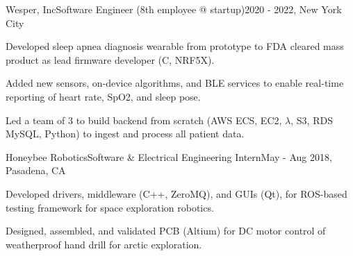 \documentclass[letterpaper,10pt]{article}
\begin{document}
\begin{joblong}{Wesper, Inc}{Software Engineer (8th employee @ startup)}{2020 - 2022, New York City}
\item Developed sleep apnea diagnosis wearable from prototype to FDA cleared mass product as lead firmware developer (C, NRF5X).
\item Added new sensors, on-device algorithms, and BLE services to enable real-time reporting of heart rate, SpO2, and sleep pose.
\item Led a team of 3 to build backend from scratch (AWS ECS, EC2, $\lambda$, S3, RDS MySQL, Python) to ingest and process all patient data.
\end{joblong}

\begin{joblong}{Honeybee Robotics}{Software \& Electrical Engineering Intern}{May - Aug 2018, Pasadena, CA}
\item Developed drivers, middleware (C++, ZeroMQ), and GUIs (Qt), for ROS-based testing framework for space exploration robotics.
\item Designed, assembled, and validated PCB (Altium) for DC motor control of weatherproof hand drill for arctic exploration.
\end{joblong}
\end{document}
